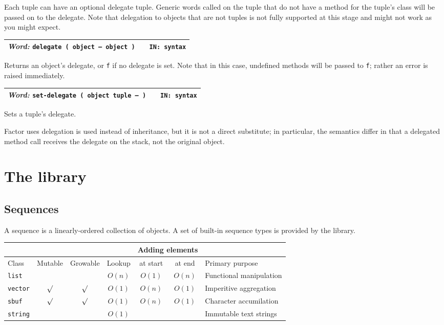 \documentclass{report}
\newcommand{\ordinaryword}[3]{\index{#1}
\emph{Word:} \texttt{#2} &&\texttt{IN: #3}}
\newcommand{\wordtable}[1]{

\begin{tabularx}{12cm}[t]{lXr}
\hline
#1\\
\hline
\end{tabularx}

}
\begin{document}

Each tuple can have an optional delegate tuple. Generic words called on
the tuple that do not have a method for the tuple's class will be passed on
to the delegate. Note that delegation to objects that are not tuples is not fully supported at this stage and might not work as you might expect.
\wordtable{
\ordinaryword{delegate}{delegate ( object -- object )}{syntax}
}
Returns an object's delegate, or \texttt{f} if no delegate is set. Note that in this case,  undefined methods will be passed to \texttt{f}; rather an error is raised immediately.
\wordtable{
\ordinaryword{set-delegate}{set-delegate ( object tuple -- )}{syntax}
}
Sets a tuple's delegate.

Factor uses delegation is used instead of inheritance, but it is not a direct
substitute; in particular, the semantics differ in that a delegated
method call receives the delegate on the stack, not the original object.

\chapter{The library}

\section{Sequences}

A sequence is a linearly-ordered collection of objects. A set of built-in sequence types  is provided by the library.

\begin{tabular}[t]{l|c|c|c|c|c|l}
\multicolumn{4}{l|}{}&\multicolumn{2}{c|}{Adding elements}&\multicolumn{1}{l}{}\\
\hline
Class&Mutable&Growable&Lookup&at start&at end&Primary purpose\\
\hline
\texttt{list}&&&$O(n)$&$O(1)$&$O(n)$&Functional manipulation\\
\texttt{vector}&$\surd$&$\surd$&$O(1)$&$O(n)$&$O(1)$&Imperitive aggregation\\
\texttt{sbuf}&$\surd$&$\surd$&$O(1)$&$O(n)$&$O(1)$&Character accumilation\\
\texttt{string}&&&$O(1)$&&&Immutable text strings
\end{tabular}
\end{document}
